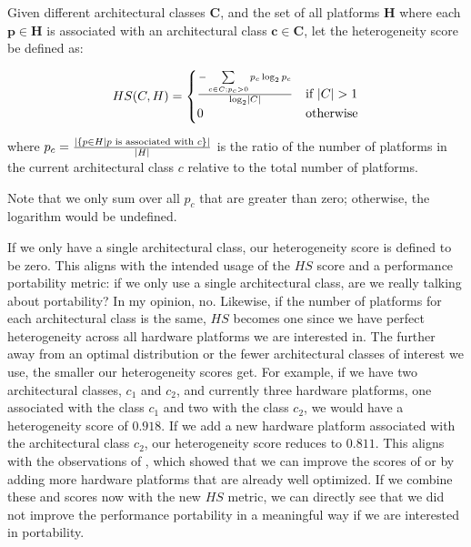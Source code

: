 \begin{definition}\label{def:hetero_score}
Given different architectural classes $\mathbf{C}$, and the set of all platforms $\mathbf{H}$ where each $\mathbf{p \in H}$ is associated with an architectural class $\mathbf{c \in C}$, let the heterogeneity score be defined as:

$$HS(C, H) = \begin{cases}
                \frac{-\sum\limits_{c \in C; p_c > 0} p_c \log_2 p_c}{\log_2\lvert C\rvert} & \text{if } \lvert C\rvert > 1 \\
                0                                                                    & \text{otherwise}
              \end{cases}$$

where $p_c = \frac{\lvert\{ p \in H \mid p \text{ is associated with } c \}\rvert}{\lvert H\rvert}$ is the ratio of the number of platforms in the current architectural class $c$ relative to the total number of platforms. 
\end{definition}
Note that we only sum over all $p_c$ that are greater than zero; otherwise, the logarithm would be undefined. 

If we only have a single architectural class, our heterogeneity score is defined to be zero. 
This aligns with the intended usage of the $HS$ score and a performance portability metric: if we only use a single architectural class, are we really talking about portability? 
In my opinion, no. 
Likewise, if the number of platforms for each architectural class is the same, $HS$ becomes one since we have perfect heterogeneity across all hardware platforms we are interested in. 
The further away from an optimal distribution or the fewer architectural classes of interest we use, the smaller our heterogeneity scores get. 
For example, if we have two architectural classes, $c_1$ and $c_2$, and currently three hardware platforms, one associated with the class $c_1$ and two with the class $c_2$, we would have a heterogeneity score of $\num{0.918}$. 
If we add a new hardware platform associated with the architectural class $c_2$, our heterogeneity score reduces to $\num{0.811}$. 
This aligns with the observations of \citet{yokota_beginners_2018}, which showed that we can improve the scores of \pp or \mpp by adding more hardware platforms that are already well optimized. 
If we combine these \pp and \mpp scores now with the new $HS$ metric, we can directly see that we did not improve the performance portability in a meaningful way if we are interested in portability. 

